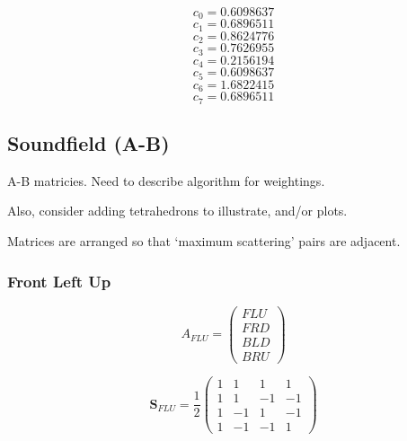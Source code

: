 \documentclass[12pt]{article}
\begin{document}
\begin{equation}
	c_{0} = 0.6098637
\end{equation}
\begin{equation}
	c_{1} = 0.6896511
\end{equation}
\begin{equation}
	c_{2} = 0.8624776
\end{equation}
\begin{equation}
	c_{3} = 0.7626955
\end{equation}
\begin{equation}
	c_{4} = 0.2156194
\end{equation}
\begin{equation}
	c_{5} = 0.6098637
\end{equation}
\begin{equation}
	c_{6} = 1.6822415
\end{equation}
\begin{equation}
	c_{7} = 0.6896511
\end{equation}



\subsection{Soundfield (A-B)}

A-B matricies. Need to describe algorithm for weightings.

Also, consider adding tetrahedrons to illustrate, and/or plots.

Matrices are arranged so that `maximum scattering' pairs are adjacent.

\subsubsection{Front Left Up}


\begin{equation}	\label{eq:aflu_sig}
A_{FLU} = \begin{pmatrix}
	FLU\\
	FRD\\
	BLD\\
	BRU
\end{pmatrix}
\end{equation}

\begin{equation}	\label{eq:ab_flu}
\mathbf{S}_{FLU} = \frac{1}{2} \begin{pmatrix}
	1 & 1 & 1 & 1\\
	1 & 1 & -1 & -1\\
	1 & -1 & 1 & -1\\
	1 & -1 & -1 & 1
\end{pmatrix}
\end{equation}
\end{document}
